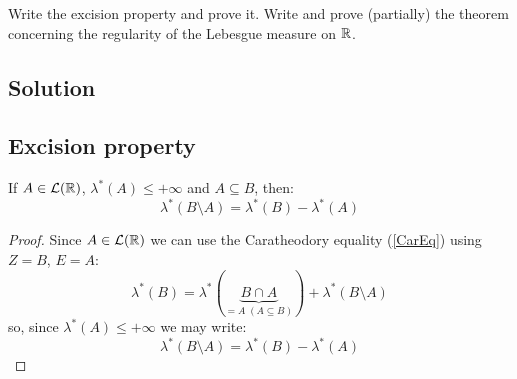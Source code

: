 

\question
Write the excision property and prove it. Write and prove (partially) the theorem concerning
the regularity of the Lebesgue measure on $\mathbb{R}$.

\subsection*{Solution}
\subsection{Excision property}\label{ExcProp}
If $A\in\mathcal{L}(\mathbb{R})$, $\lambda^*(A)\leq +\infty$ and $A\subseteq B$, then:
\[
    \lambda^*(B\setminus A) = \lambda^* (B) - \lambda^*(A)
\]
\begin{proof}
    Since $A\in\mathcal{L}(\mathbb{R})$ we can use the Caratheodory equality (\ref{CarEq}) using $Z=B$, $E=A$:
    \[
        \lambda^*(B) = \lambda^*(\underbrace{B\cap A}_{=A \; (A\subseteq B)}) + \lambda^* (B\setminus A)
    \]
    so, since $\lambda^*(A)\leq +\infty$ we may write:
    \[
        \lambda^*(B\setminus A) = \lambda^*(B)-\lambda^*(A)
    \]
\end{proof}

